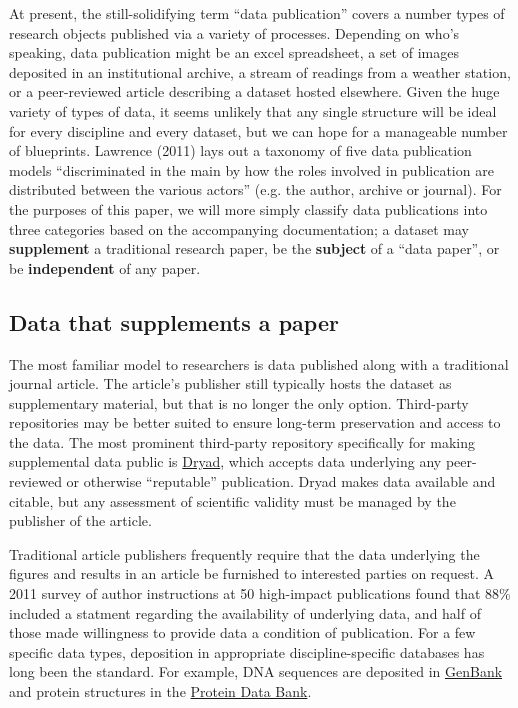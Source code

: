 \documentclass[10pt,a4paper,twocolumn]{article}
\begin{document}
At present, the still-solidifying term ``data publication'' covers a number types of research objects published via a variety of processes.
Depending on who's speaking,  data publication might be an excel spreadsheet, a set of images deposited in an institutional archive, a stream of readings from a weather station, or a peer-reviewed article describing a dataset hosted elsewhere.
Given the huge variety of types of data, it seems unlikely that any single structure will be ideal for every discipline and every dataset, but we can hope for a manageable number of blueprints. 
Lawrence (2011) lays out a taxonomy of five data publication models ``discriminated in the main by how the roles involved in publication are distributed between the various actors'' (e.g. the author, archive or journal).\cite{lawrence_data_2011}
For the purposes of this paper, we will more simply classify data publications into three categories based on the accompanying documentation; a dataset may \textbf{supplement} a traditional research paper, be the \textbf{subject} of a ``data paper'', or be \textbf{independent} of any paper.


\subsection*{Data that supplements a paper}\label{paper-supplement-data}

The most familiar model to researchers is data published along with a traditional journal article. 
The article's publisher still typically hosts the dataset as supplementary material, but that is no longer the only option.
Third-party repositories may be better suited to ensure long-term preservation and access to the data.
The most prominent third-party repository specifically for making supplemental data public is \href{http://www.datadryad.org/}{Dryad}, which accepts data underlying any peer-reviewed or otherwise ``reputable'' publication. 
Dryad makes data available and citable, but any assessment of scientific validity must be managed by the publisher of the article. 

Traditional article publishers frequently require that the data underlying the figures and results in an article be furnished to interested parties on request.
A 2011 survey of author instructions at 50 high-impact publications found that 88\% included a statment regarding the availability of underlying data, and half of those made willingness to provide data a condition of publication.\cite{alsheikh-ali_public_2011}
For a few specific data types, deposition in appropriate discipline-specific databases has long been the standard. 
For example, DNA sequences are deposited in \href{http://www.ncbi.nlm.nih.gov/genbank/}{GenBank}\cite{benson_genbank_2013} and protein structures in the \href{http://www.rcsb.org/}{Protein Data Bank}\cite{berman_protein_2000}.
\end{document}
